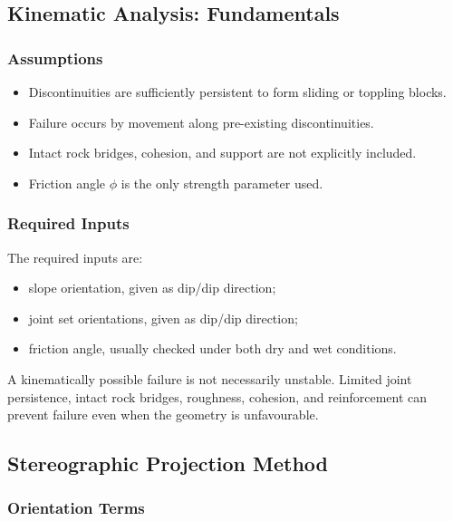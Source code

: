 \documentclass[a4paper,12pt]{article}
\begin{document}
\subsection{Kinematic Analysis: Fundamentals}

\subsubsection{Assumptions}

\begin{itemize}[nosep]
    \item Discontinuities are sufficiently persistent to form sliding or toppling blocks.
    \item Failure occurs by movement along pre-existing discontinuities.
    \item Intact rock bridges, cohesion, and support are not explicitly included.
    \item Friction angle $\phi$ is the only strength parameter used.
\end{itemize}

\subsubsection{Required Inputs}

The required inputs are:
\begin{itemize}[nosep]
    \item slope orientation, given as dip/dip direction;
    \item joint set orientations, given as dip/dip direction;
    \item friction angle, usually checked under both dry and wet conditions.
\end{itemize}

\begin{warnbox}
A kinematically possible failure is not necessarily unstable. Limited joint persistence, intact rock bridges, roughness, cohesion, and reinforcement can prevent failure even when the geometry is unfavourable.
\end{warnbox}

\subsection{Stereographic Projection Method}

\subsubsection{Orientation Terms}
\end{document}
